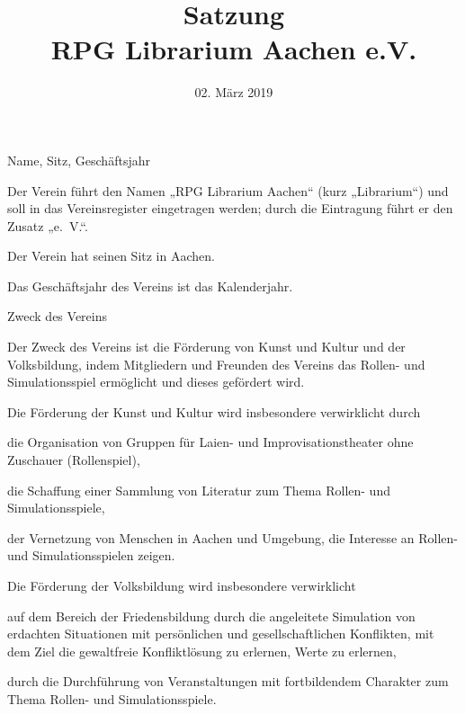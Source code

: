 \documentclass[11pt,a4paper,twoside,openany,article]{memoir}
\title{ Satzung \\ RPG Librarium Aachen e.V.}
\date{02. März 2019}
\begin{document}
  \maketitle
  \sloppy
\begin{para}{Name, Sitz, Geschäftsjahr}
  \label{p:name}
  \item Der Verein führt den Namen „RPG Librarium Aachen“ (kurz „Librarium“) und soll in das Vereinsregister eingetragen werden; durch die Eintragung führt er den Zusatz „e.~V.“.
  \item Der Verein hat seinen Sitz in Aachen.
  \item Das Geschäftsjahr des Vereins ist das Kalenderjahr.
\end{para}

\begin{para}{Zweck des Vereins}
  \label{p:zweck}
  \item Der Zweck des Vereins ist die Förderung von Kunst und Kultur und der Volksbildung, indem Mitgliedern und Freunden des Vereins das Rollen- und Simulationsspiel ermöglicht und dieses gefördert wird.
  \item Die Förderung der Kunst und Kultur wird insbesondere verwirklicht durch
  \begin{subpara}
    \item die Organisation von Gruppen für Laien- und Improvisationstheater ohne Zuschauer (Rollenspiel),
    \item die Schaffung einer Sammlung von Literatur zum Thema Rollen- und Simulationsspiele,
    \item der Vernetzung von Menschen in Aachen und Umgebung, die Interesse an Rollen- und Simulationsspielen zeigen.
  \end{subpara}
  \item Die Förderung der Volksbildung wird insbesondere verwirklicht
  \begin{subpara}
    \item auf dem Bereich der Friedensbildung durch die angeleitete Simulation von erdachten Situationen mit persönlichen und gesellschaftlichen Konflikten, mit dem Ziel die gewaltfreie Konfliktlösung zu erlernen,
 Werte zu erlernen,
    \item durch die Durchführung von Veranstaltungen mit fortbildendem Charakter zum Thema Rollen- und Simulationsspiele.
  \end{subpara}
\end{para}
\end{document}
